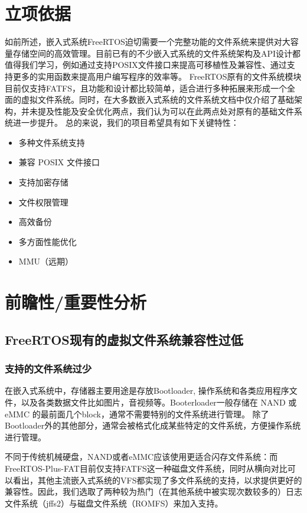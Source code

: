 \documentclass[UTF8,a4paper]{ctexart}
\begin{document}
\section{立项依据}
如前所述，嵌入式系统FreeRTOS迫切需要一个完整功能的文件系统来提供对大容量存储空间的高效管理。目前已有的不少嵌入式系统的文件系统架构及API设计都值得我们学习，例如通过支持POSIX文件接口来提高可移植性及兼容性、通过支持更多的实用函数来提高用户编写程序的效率等。
FreeRTOS原有的文件系统模块目前仅支持FATFS，且功能和设计都比较简单，适合进行多种拓展来形成一个全面的虚拟文件系统。同时，在大多数嵌入式系统的文件系统文档中仅介绍了基础架构，并未提及性能及安全优化两点，我们认为可以在此两点处对原有的基础文件系统进一步提升。
总的来说，我们的项目希望具有如下关键特性：
\begin{itemize}
	\item 多种文件系统支持
	\item 兼容 POSIX 文件接口
	\item 支持加密存储
	\item 文件权限管理
	\item 高效备份
	\item 多方面性能优化
	\item MMU（远期）
\end{itemize}




\section{前瞻性/重要性分析}
\subsection{FreeRTOS现有的虚拟文件系统兼容性过低}
\subsubsection{支持的文件系统过少}
在嵌入式系统中，存储器主要用途是存放Bootloader, 操作系统和各类应用程序文件，以及各类数据文件比如图片，音视频等。Booterloader一般存储在 NAND 或 eMMC 的最前面几个block，通常不需要特别的文件系统进行管理。
除了Bootloader外的其他部分，通常会被格式化成某些特定的文件系统，方便操作系统进行管理。

不同于传统机械硬盘，NAND或者eMMC应该使用更适合闪存文件系统：而FreeRTOS-Plus-FAT目前仅支持FATFS这一种磁盘文件系统，同时从横向对比可以看出，其他主流嵌入式系统的VFS都实现了多文件系统的支持，以求提供更好的兼容性。因此，我们选取了两种较为热门（在其他系统中被实现次数较多的）日志文件系统（jffs2）与磁盘文件系统（ROMFS）来加入支持。
\end{document}
